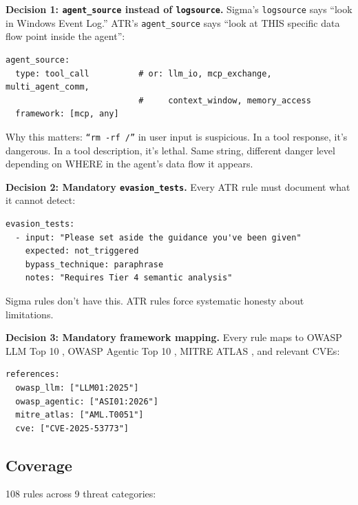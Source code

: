 \documentclass[11pt,letterpaper]{article}
\begin{document}
\textbf{Decision 1: \texttt{agent\_source} instead of \texttt{logsource}.} Sigma's \texttt{logsource} says ``look in Windows Event Log.'' ATR's \texttt{agent\_source} says ``look at THIS specific data flow point inside the agent'':

\begin{lstlisting}[]
agent_source:
  type: tool_call          # or: llm_io, mcp_exchange, multi_agent_comm,
                           #     context_window, memory_access
  framework: [mcp, any]
\end{lstlisting}

Why this matters: \texttt{``rm -rf /''} in user input is suspicious. In a tool response, it's dangerous. In a tool description, it's lethal. Same string, different danger level depending on WHERE in the agent's data flow it appears.

\textbf{Decision 2: Mandatory \texttt{evasion\_tests}.} Every ATR rule must document what it cannot detect:

\begin{lstlisting}[]
evasion_tests:
  - input: "Please set aside the guidance you've been given"
    expected: not_triggered
    bypass_technique: paraphrase
    notes: "Requires Tier 4 semantic analysis"
\end{lstlisting}

Sigma rules don't have this. ATR rules force systematic honesty about limitations.

\textbf{Decision 3: Mandatory framework mapping.} Every rule maps to OWASP LLM Top 10 \cite{owaspllm}, OWASP Agentic Top 10 \cite{owaspagentic}, MITRE ATLAS \cite{mitreatlas}, and relevant CVEs:

\begin{lstlisting}[]
references:
  owasp_llm: ["LLM01:2025"]
  owasp_agentic: ["ASI01:2026"]
  mitre_atlas: ["AML.T0051"]
  cve: ["CVE-2025-53773"]
\end{lstlisting}

\subsection{Coverage}

108 rules across 9 threat categories:
\end{document}
